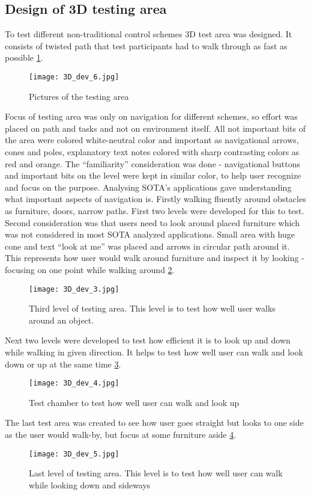 \subsection{Design of 3D testing area}
To test different non-traditional control schemes 3D test area was designed. It consists of twisted path that test participants had to walk through as fast as possible \ref{TestLevels}.
\begin{figure}[H]
\centering
\texttt{[image: 3D\_dev\_6.jpg]}
\caption{Pictures of the testing area}
\label{TestLevels}
\end{figure}
Focus of testing area was only on navigation for different schemes, so effort was placed on path and tasks and not on environment itself. All not important bits of the area were colored white-neutral color and important as navigational arrows, cones and poles, explanatory text notes colored with sharp contrasting colors as red and orange. The “familiarity” consideration was done - navigational buttons and important bits on the level were kept in similar color, to help user recognize and focus on the purpose.
Analysing SOTA’s applications gave understanding what important aspects of navigation is. Firstly walking fluently around obstacles as furniture, doors, narrow paths. First two levels were developed for this to test. Second consideration was that users need to look around placed furniture which was not considered in most SOTA analyzed applications. Small area with huge cone and text “look at me” was placed and arrows in circular path around it. This represents how user would walk around furniture and inspect it by looking - focusing on one point while walking around \ref{TestLevel3}.
\begin{figure}[H]
\centering
\texttt{[image: 3D\_dev\_3.jpg]}
\caption{Third level of testing area. This level is to test how well user walks around an object.}
\label{TestLevel3}
\end{figure}
Next two levels were developed to test how efficient it is to look up and down while walking in given direction. It helps to test how well user can walk and look down or up at the same time \ref{TestLevel4}.
\begin{figure}[H]
\centering
\texttt{[image: 3D\_dev\_4.jpg]}
\caption{Test chamber to test how well user can walk and look up}
\label{TestLevel4}
\end{figure}
The last test area was created to see how user goes straight but looks to one side as the user would walk-by, but focus at some furniture aside \ref{TestLevel5}.
\begin{figure}[H]
\centering
\texttt{[image: 3D\_dev\_5.jpg]}
\caption{Last level of testing area. This level is to test how well user can walk while looking down and sideways}
\label{TestLevel5}
\end{figure}